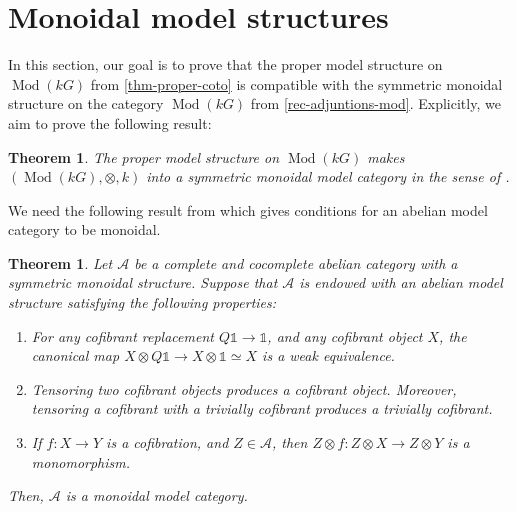 \documentclass{amsart}
\newcommand{\GD}[1]{{\color{ForestGreen} G: [#1]}}
\DeclareMathOperator{\Mod}{Mod}
\numberwithin{equation}{section}%
\newtheorem{theorem}[equation]{Theorem}
\theoremstyle{remark}
\begin{document}
{\section{Monoidal model structures}

In this section, our goal is to prove that the proper model structure on $\Mod(kG)$ from \cref{thm-proper-coto} is compatible with the symmetric monoidal structure  on the category $\Mod(kG)$ from \cref{rec-adjuntions-mod}. Explicitly, we aim to prove the following result: %



\begin{theorem}
\label{prop-monoidal-proper}
The proper model structure on $\Mod(kG)$ makes $(\Mod(kG), \otimes,k)$ into a symmetric monoidal model category in the sense of \cite[Definition 4.2.6]{Hov99}.
\end{theorem}


We need the following result from \cite[Proposition 7.2]{Hov02} which gives conditions for an abelian model category to be monoidal.

\begin{theorem}\label{thm-hov}
   Let $\mathcal{A}$ be a complete and cocomplete abelian category  with a symmetric monoidal structure. Suppose that $\mathcal{A}$ is endowed with an abelian model structure satisfying the following properties:
   \begin{enumerate}
       \item For any cofibrant replacement $Q\mathbb 1\to \mathbb 1 $, and any cofibrant object $X$, the canonical map  $X\otimes Q\mathbb 1\to X\otimes \mathbb 1 \simeq X$ is a weak equivalence. 
       \item Tensoring two cofibrant objects produces a cofibrant object.  Moreover, tensoring a cofibrant with a trivially cofibrant produces a trivially cofibrant.
       \item If $f\colon X\to Y$ is a cofibration, and $Z\in \mathcal{A}$, then $Z\otimes f\colon Z\otimes X\to Z\otimes Y$ is a monomorphism. 
   \end{enumerate}
Then, $\mathcal{A}$ is a monoidal model category. 
\end{theorem}


}
\end{document}
